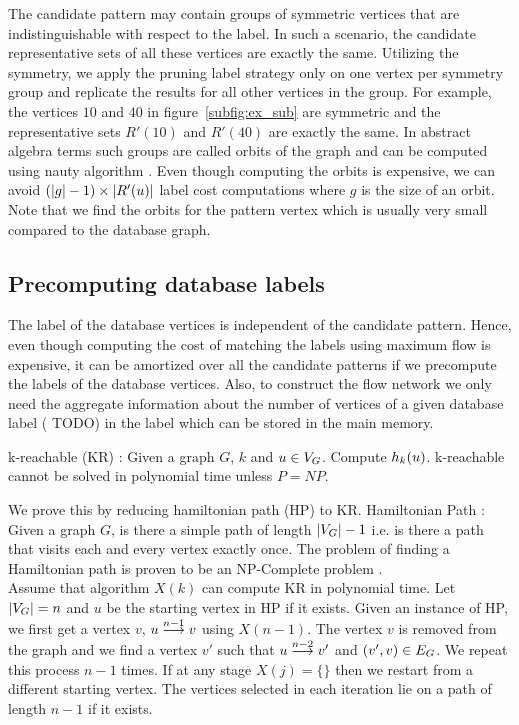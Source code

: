  The candidate pattern may contain groups of
symmetric vertices that are indistinguishable with respect to the \khop label.
In such a scenario, the candidate representative sets of all these vertices are
exactly the same. Utilizing the symmetry, we apply the pruning label strategy only on
one vertex per symmetry group and replicate the results for all other vertices
in the group. For example, the vertices $10$ and $40$ in
figure~\ref{subfig:ex_sub} are symmetric and the representative sets $R'(10)$
and $R'(40)$ are exactly the same.  In abstract algebra terms such  groups are
called orbits of the graph and can be computed using nauty algorithm
\cite{nauty}. 
Even
though computing the orbits is expensive, we can avoid $ (|g|-1) \times |\CR|$
\ncl label cost computations where $g$ is the size of an orbit. Note that
we find the orbits for the pattern vertex which is usually very small compared
to the database graph.

\subsection{Precomputing database \khop labels} The \khop label of the database
vertices is independent of the candidate pattern. Hence, even though computing
the cost of matching the \khop labels using maximum flow is expensive, it can be
amortized over all the candidate patterns  if we precompute the \khop labels of
the database vertices. Also, to construct the flow network we only need the
aggregate information about the number of vertices of a given database label (
TODO) in the \khop label which can be stored in the main memory. 

\begin{thm} k-reachable (KR) : Given a graph $G$, $k$ and $u \in \vg$. Compute
    $\khopl{k}{u}$.  k-reachable cannot be solved in polynomial time unless $P =
    NP$.

\begin{myproof} We prove this by reducing hamiltonian path (HP) to KR.
    Hamiltonian Path : Given a graph $G$, is there a simple path of length
    $|\vg|-1$ i.e. is there a path that visits each and every vertex exactly
    once. The problem of finding a Hamiltonian path is proven to be an
    NP-Complete problem \cite{npcomplete}.\\ Assume that algorithm $X(k)$ can
    compute KR in polynomial time. Let $|\vg| = n$ and $u$ be the starting
    vertex in HP if it exists.  Given an instance of HP, we first get a vertex
    $v$, $\kpath{u}{v}{n-1}$ using $X(n-1)$. The vertex $v$ is removed from the
    graph and we find a vertex $v'$ such that $\kpath{u}{v'}{n-2}$ and $(v', v)
    \in \eg$. We repeat this process $n-1$ times. If at any stage $X(j) = \{\}$
    then we restart from a different starting vertex. The vertices selected in
    each iteration lie on a path of length $n-1$ if it exists.  \end{myproof}
\end{thm}

